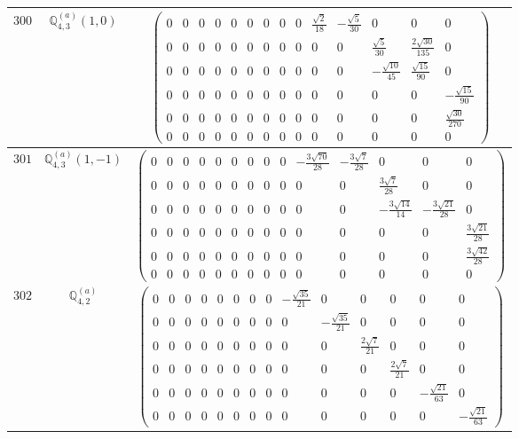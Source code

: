 \documentclass[fleqn,8pt,landscape]{jsarticle}
\begin{document}
\begin{center}
\begin{longtable}{ccc}
$ 300 $ & $ \mathbb{Q}_{4,3}^{(a)}(1,0) $ & $ \begin{pmatrix} 0 & 0 & 0 & 0 & 0 & 0 & 0 & 0 & 0 & \frac{\sqrt{2}}{18} & - \frac{\sqrt{5}}{30} & 0 & 0 & 0 \\ 0 & 0 & 0 & 0 & 0 & 0 & 0 & 0 & 0 & 0 & 0 & \frac{\sqrt{5}}{30} & \frac{2 \sqrt{30}}{135} & 0 \\ 0 & 0 & 0 & 0 & 0 & 0 & 0 & 0 & 0 & 0 & 0 & - \frac{\sqrt{10}}{45} & \frac{\sqrt{15}}{90} & 0 \\ 0 & 0 & 0 & 0 & 0 & 0 & 0 & 0 & 0 & 0 & 0 & 0 & 0 & - \frac{\sqrt{15}}{90} \\ 0 & 0 & 0 & 0 & 0 & 0 & 0 & 0 & 0 & 0 & 0 & 0 & 0 & \frac{\sqrt{30}}{270} \\ 0 & 0 & 0 & 0 & 0 & 0 & 0 & 0 & 0 & 0 & 0 & 0 & 0 & 0 \end{pmatrix} $ \\ \hline
$ 301 $ & $ \mathbb{Q}_{4,3}^{(a)}(1,-1) $ & $ \begin{pmatrix} 0 & 0 & 0 & 0 & 0 & 0 & 0 & 0 & 0 & - \frac{3 \sqrt{70}}{28} & - \frac{3 \sqrt{7}}{28} & 0 & 0 & 0 \\ 0 & 0 & 0 & 0 & 0 & 0 & 0 & 0 & 0 & 0 & 0 & \frac{3 \sqrt{7}}{28} & 0 & 0 \\ 0 & 0 & 0 & 0 & 0 & 0 & 0 & 0 & 0 & 0 & 0 & - \frac{3 \sqrt{14}}{14} & - \frac{3 \sqrt{21}}{28} & 0 \\ 0 & 0 & 0 & 0 & 0 & 0 & 0 & 0 & 0 & 0 & 0 & 0 & 0 & \frac{3 \sqrt{21}}{28} \\ 0 & 0 & 0 & 0 & 0 & 0 & 0 & 0 & 0 & 0 & 0 & 0 & 0 & \frac{3 \sqrt{42}}{28} \\ 0 & 0 & 0 & 0 & 0 & 0 & 0 & 0 & 0 & 0 & 0 & 0 & 0 & 0 \end{pmatrix} $ \\ \hline
$ 302 $ & $ \mathbb{Q}_{4,2}^{(a)} $ & $ \begin{pmatrix} 0 & 0 & 0 & 0 & 0 & 0 & 0 & 0 & - \frac{\sqrt{35}}{21} & 0 & 0 & 0 & 0 & 0 \\ 0 & 0 & 0 & 0 & 0 & 0 & 0 & 0 & 0 & - \frac{\sqrt{35}}{21} & 0 & 0 & 0 & 0 \\ 0 & 0 & 0 & 0 & 0 & 0 & 0 & 0 & 0 & 0 & \frac{2 \sqrt{7}}{21} & 0 & 0 & 0 \\ 0 & 0 & 0 & 0 & 0 & 0 & 0 & 0 & 0 & 0 & 0 & \frac{2 \sqrt{7}}{21} & 0 & 0 \\ 0 & 0 & 0 & 0 & 0 & 0 & 0 & 0 & 0 & 0 & 0 & 0 & - \frac{\sqrt{21}}{63} & 0 \\ 0 & 0 & 0 & 0 & 0 & 0 & 0 & 0 & 0 & 0 & 0 & 0 & 0 & - \frac{\sqrt{21}}{63} \end{pmatrix} $ \\ \hline

\end{longtable}
\end{center}
\end{document}
